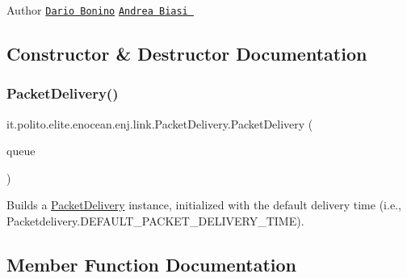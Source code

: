 \begin{DoxyAuthor}{Author}
\href{mailto:dario.bonino@gmail.com}{\tt Dario Bonino}  \href{mailto:biasiandrea04@gmail.com}{\tt Andrea Biasi } 
\end{DoxyAuthor}


\subsection{Constructor \& Destructor Documentation}
\hypertarget{classit_1_1polito_1_1elite_1_1enocean_1_1enj_1_1link_1_1_packet_delivery_a0c92fe58435e83413e79c68a544094d8}{}\label{classit_1_1polito_1_1elite_1_1enocean_1_1enj_1_1link_1_1_packet_delivery_a0c92fe58435e83413e79c68a544094d8} 
\subsubsection{\texorpdfstring{Packet\+Delivery()}{PacketDelivery()}}
{\footnotesize\ttfamily it.\+polito.\+elite.\+enocean.\+enj.\+link.\+Packet\+Delivery.\+Packet\+Delivery (\begin{DoxyParamCaption}\item[{Concurrent\+Linked\+Queue$<$ \hyperlink{classit_1_1polito_1_1elite_1_1enocean_1_1enj_1_1link_1_1_packet_queue_item}{Packet\+Queue\+Item} $>$}]{queue }\end{DoxyParamCaption})}

Builds a \hyperlink{classit_1_1polito_1_1elite_1_1enocean_1_1enj_1_1link_1_1_packet_delivery}{Packet\+Delivery} instance, initialized with the default delivery time (i.\+e., {\ttfamily Packetdelivery.\+D\+E\+F\+A\+U\+L\+T\+\_\+\+P\+A\+C\+K\+E\+T\+\_\+\+D\+E\+L\+I\+V\+E\+R\+Y\+\_\+\+T\+I\+ME}). 

\subsection{Member Function Documentation}
\hypertarget{classit_1_1polito_1_1elite_1_1enocean_1_1enj_1_1link_1_1_packet_delivery_a44fcf99d637f82a25569dacccb540d0e}{}\label{classit_1_1polito_1_1elite_1_1enocean_1_1enj_1_1link_1_1_packet_delivery_a44fcf99d637f82a25569dacccb540d0e} 
